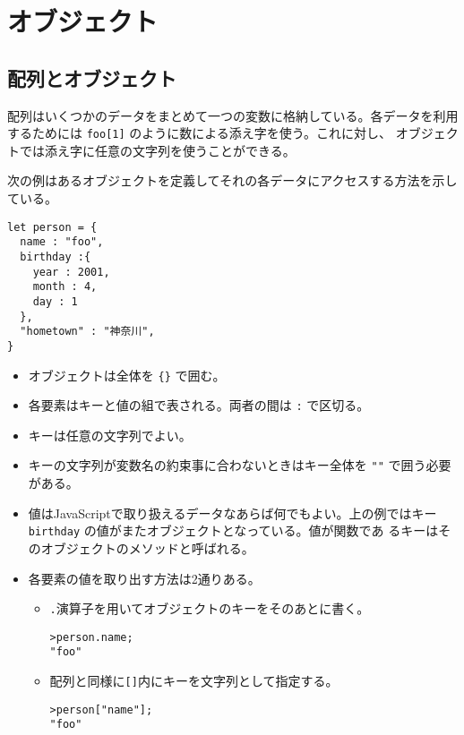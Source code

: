 \chapter{オブジェクト}
\section{配列とオブジェクト}
配列はいくつかのデータをまとめて一つの変数に格納している。各データを利用
するためには \verb+foo[1]+ のように数による添え字を使う。これに対し、
オブジェクトでは添え字に任意の文字列を使うことができる。
\begin{Exec}\label{Execconstructor}\upshape
次の例はあるオブジェクトを定義してそれの各データにアクセスする方法を示している。
\begin{Verbatim}
let person = {
  name : "foo",
  birthday :{
    year : 2001,
    month : 4,
    day : 1
  },
  "hometown" : "神奈川",
}
\end{Verbatim}
\begin{itemize}
 \item オブジェクトは全体を \verb+{}+ で囲む。
 \item 各要素はキーと値の組で表される。両者の間は \verb+:+ で区切る。
 \item キーは任意の文字列でよい。
 \item キーの文字列が変数名の約束事に合わないときはキー全体を \verb+""+
			 で囲う必要がある。
 \item 値はJavaScriptで取り扱えるデータなあらば何でもよい。上の例ではキー
       \verb+birthday+ の値がまたオブジェクトとなっている。値が関数であ
       るキーはそのオブジェクトのメソッドと呼ばれる。
 \item 各要素の値を取り出す方法は2通りある。
\begin{itemize}
 \item \verb+.+演算子を用いてオブジェクトのキーをそのあとに書く。
\begin{Verbatim}
>person.name;
"foo"
\end{Verbatim}
 \item 配列と同様に\verb+[]+内にキーを文字列として指定する。
\begin{Verbatim}
>person["name"];
"foo"
\end{Verbatim}
\end{itemize}


\end{itemize}
\end{Exec}
